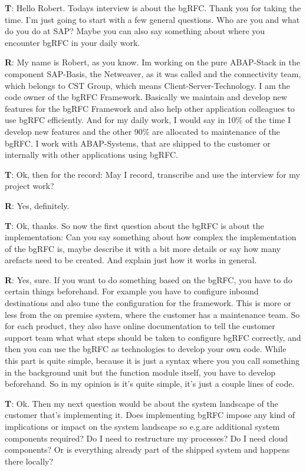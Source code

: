 \begin{list}{X:}{\setlength{\labelsep}{5mm}}
 \linenumbers[1]
 \item[\textbf{T}:] Hello Robert. Todays interview is about the bgRFC. Thank you for taking the time. I'm just going to start with a few general questions. Who are you and what do you do at SAP? Maybe you can also say something about where you encounter bgRFC in your daily work.
 \item[\textbf{R}:] My name is Robert, as you know. Im working on the pure ABAP-Stack in the component SAP-Basis, the Netweaver, as it was called and the connectivity team, which belongs to CST Group, which means Client-Server-Technology. I am the code owner of the bgRFC Framework. Basically we maintain and develop new features for the bgRFC Framework and also help other application colleagues to use bgRFC efficiently. And for my daily work, I would say in 10\% of the time I develop new features and the other 90\% are allocated to maintenance of the bgRFC. I work with ABAP-Systems, that are shipped to the customer or internally with other applications using bgRFC.
 \item[\textbf{T}:] Ok, then for the record: May I record, transcribe and use the interview for my project work?
 \item[\textbf{R}:] Yes, definitely.
 \item[\textbf{T}:] Ok, thanks. So now the first question about the bgRFC is about the implementation: Can you say something about how complex the implementation of the bgRFC is, maybe describe it with a bit more details or say how many arefacts need to be created. And explain just how it works in general. 
 \item[\textbf{R}:] Yes, sure. If you want to do something based on the bgRFC, you have to do certain things beforehand. For example you have to configure inbound destinations and also tune the configuration for the framework. This is more or less from the on premise system, where the customer has a maintenance team. So for each product, they also have online documentation to tell the customer support team what what steps should be taken to configure bgRFC correctly, and then you can use the bgRFC as technologies to develop your own code. While this part is quite simple, because it is just a syntax where you you call something in the background unit but the function module itself, you have to develop beforehand. So in my opinion is it's quite simple, it's just a couple lines of code.
 \item[\textbf{T}:] Ok. Then my next question would be about the system landscape of the customer that's implementing it. Does implementing bgRFC impose any kind of implications or impact on the system landscape so e.g.are additional system components required? Do I need to restructure my processes? Do I need cloud components? Or is everything already part of the shipped system and happens there locally?

\end{list}
